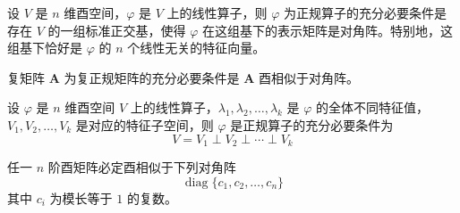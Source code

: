 \begin{theorem}
   设 $V$ 是 $n$ 维酉空间，$\varphi $ 是 $V$ 上的线性算子，则 $\varphi$ 为正规算子的充分必要条件是存在 $V$ 的一组标准正交基，使得 $\varphi$ 在这组基下的表示矩阵是对角阵。特别地，这组基下恰好是 $\varphi$ 的 $n$ 个线性无关的特征向量。
\end{theorem}

\begin{theorem}
  复矩阵 $\bm{A}$ 为复正规矩阵的充分必要条件是 $\bm{A}$ 酉相似于对角阵。
\end{theorem}

\begin{proposition}
  设 $\varphi$ 是 $n$ 维酉空间 $V$ 上的线性算子，$\lambda_1, \lambda_2, \ldots, \lambda_k$ 是 $\varphi$ 的全体不同特征值，$V_1, V_2, \ldots, V_k$ 是对应的特征子空间，则 $\varphi$ 是正规算子的充分必要条件为
  \[
      V = V_1 \perp V_2 \perp \cdots \perp V_k
  \]
\end{proposition}

\begin{theorem}
  任一 $n$ 阶酉矩阵必定酉相似于下列对角阵
  \[
      \operatorname{diag}\{c_1, c_2, \ldots, c_n\}
  \]
  其中 $c_i$ 为模长等于 $1$ 的复数。
\end{theorem}
